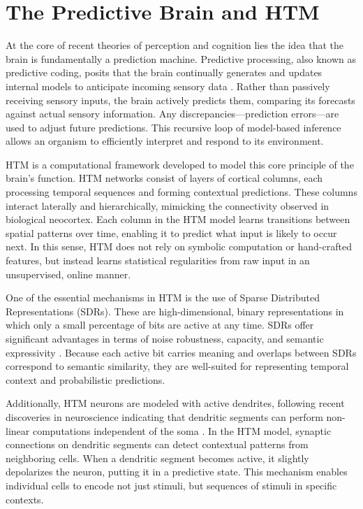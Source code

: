 \documentclass{article}
\begin{document}
\section{The Predictive Brain and HTM}

At the core of recent theories of perception and cognition lies the idea that the brain is fundamentally a prediction machine. Predictive processing, also known as predictive coding, posits that the brain continually generates and updates internal models to anticipate incoming sensory data \parencite{clark2016surfing, friston2010free}. Rather than passively receiving sensory inputs, the brain actively predicts them, comparing its forecasts against actual sensory information. Any discrepancies---prediction errors---are used to adjust future predictions. This recursive loop of model-based inference allows an organism to efficiently interpret and respond to its environment.

HTM is a computational framework developed to model this core principle of the brain's function. HTM networks consist of layers of cortical columns, each processing temporal sequences and forming contextual predictions. These columns interact laterally and hierarchically, mimicking the connectivity observed in biological neocortex. Each column in the HTM model learns transitions between spatial patterns over time, enabling it to predict what input is likely to occur next. In this sense, HTM does not rely on symbolic computation or hand-crafted features, but instead learns statistical regularities from raw input in an unsupervised, online manner.

One of the essential mechanisms in HTM is the use of Sparse Distributed Representations (SDRs). These are high-dimensional, binary representations in which only a small percentage of bits are active at any time. SDRs offer significant advantages in terms of noise robustness, capacity, and semantic expressivity \parencite{ahmad2015properties}. Because each active bit carries meaning and overlaps between SDRs correspond to semantic similarity, they are well-suited for representing temporal context and probabilistic predictions.

Additionally, HTM neurons are modeled with active dendrites, following recent discoveries in neuroscience indicating that dendritic segments can perform non-linear computations independent of the soma \parencite{hawkins2016why}. In the HTM model, synaptic connections on dendritic segments can detect contextual patterns from neighboring cells. When a dendritic segment becomes active, it slightly depolarizes the neuron, putting it in a predictive state. This mechanism enables individual cells to encode not just stimuli, but sequences of stimuli in specific contexts.
\end{document}
